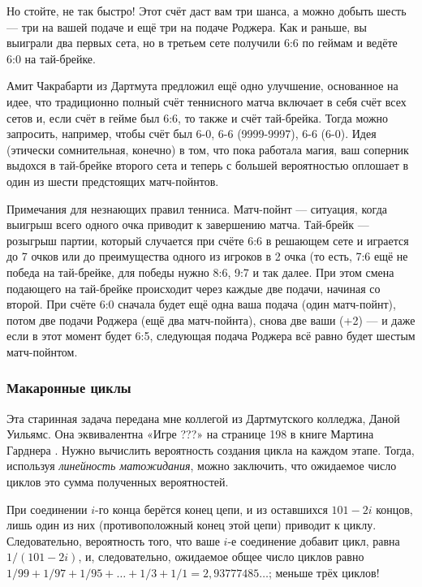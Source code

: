 Но стойте, не так быстро!
Этот счёт даст вам три шанса, а можно добыть шесть --- три на вашей подаче и ещё три на подаче Роджера.
Как и раньше, вы выиграли два первых сета, но в третьем сете получили 6:6 по геймам и ведёте 6:0 на тай-брейке.

Амит Чакрабарти из Дартмута предложил ещё одно улучшение, основанное на идее, что традиционно полный счёт теннисного матча включает в себя счёт всех сетов и, если счёт в гейме был 6:6, то также и счёт тай-брейка.
Тогда можно запросить, например, чтобы счёт был 6-0, 6-6 (9999-9997), 6-6 (6-0).
Идея (этически сомнительная, конечно) в том, что пока работала магия, ваш соперник выдохся в тай-брейке второго сета и теперь с большей вероятностью оплошает в один из шести предстоящих матч-пойнтов.

\begin{addedbytheeditors}
Примечания для незнающих правил тенниса.
Матч-пойнт --- ситуация, когда выигрыш всего одного очка приводит к завершению матча.
Тай-брейк --- розыгрыш партии, который
случается при счёте 6:6 в решающем сете и играется до 7 очков или до
преимущества
одного из игроков в 2 очка (то есть, 7:6 ещё не победа на тай-брейке, для победы нужно 8:6, 9:7 и так далее. При этом смена подающего на тай-брейке происходит через каждые две подачи, начиная со второй.
При счёте 6:0 сначала будет ещё одна ваша подача (один матч-пойнт), потом две подачи Роджера (ещё два матч-пойнта), снова две ваши (+2) --- и даже если в этот момент будет 6:5, следующая подача Роджера всё равно будет шестым матч-пойнтом.
\end{addedbytheeditors}

\subsubsection*{Макаронные циклы}

Эта старинная задача передана мне коллегой из Дартмутского колледжа, Даной Уильямс.
Она эквивалентна «Игре ???» на странице 198 в книге Мартина Гарднера \cite{gardner1971}.
Нужно вычислить вероятность создания цикла на каждом этапе.
Тогда, используя \emph{линейность матожидания}, можно заключить, что ожидаемое число циклов это сумма полученных вероятностей.

При соединении $i$-го конца берётся конец цепи, и из оставшихся $101 - 2i$ концов, лишь один из них (противоположный конец этой цепи) приводит к циклу.
Следовательно, вероятность того, что ваше $i$-е соединение добавит цикл, равна $1/(101 - 2i)$, и, следовательно, ожидаемое общее число циклов равно $1/99 + 1/97 + 1/95 +\dots + 1/3 + 1/1 = 2{,}93777485\dots$; меньше трёх циклов!

